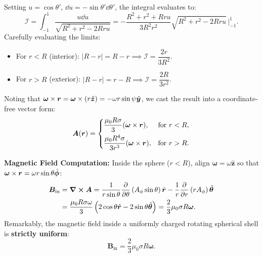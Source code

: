 \begin{example}
\begin{equation}
    \end{equation}
    Setting $u = \cos\theta'$, $\dd{u} = -\sin\theta'\dd{\theta'}$, the integral evaluates to:
    \begin{equation}
        \mathcal{I} = \int_{-1}^1 \frac{u \dd{u}}{\sqrt{R^2 + r^2 - 2Rru}} = -\frac{R^2 + r^2 + Rru}{3R^2 r^2}\sqrt{R^2 + r^2 - 2Rru}\,\Bigg|_{-1}^{1}.
    \end{equation}
    Carefully evaluating the limits:
    \begin{itemize}
        \item For $r < R$ (interior): $|R - r| = R - r \implies \mathcal{I} = \dfrac{2r}{3R^2}$.
        \item For $r > R$ (exterior): $|R - r| = r - R \implies \mathcal{I} = \dfrac{2R}{3r^2}$.
    \end{itemize}
    Noting that $\bm{\omega}\times \bm{r} = \bm{\omega}\times (r\hat{\bm{z}}) = -\omega r \sin\psi \hat{\bm{y}}$, we cast the result into a coordinate-free vector form:
    \begin{equation}
        \bm{A}(\bm{r}) = \begin{cases}
            \dfrac{\mu_0 R \sigma}{3} (\bm{\omega}\times \bm{r}), & \text{for } r < R, \\[1.5ex]
            \dfrac{\mu_0 R^4 \sigma}{3r^3} (\bm{\omega}\times \bm{r}), & \text{for } r > R.
        \end{cases}
    \end{equation}

    \textbf{Magnetic Field Computation:}
    Inside the sphere ($r < R$), align $\bm{\omega} = \omega \hat{\bm{z}}$ so that $\bm{\omega}\times \bm{r} = \omega r \sin\theta \hat{\bm{\phi}}$:
    \begin{align}
        \bm{B}_{\text{in}} &= \curl \bm{A} = \frac{1}{r\sin\theta}\pdv{\theta}\left(A_\phi \sin\theta\right)\hat{\bm{r}} - \frac{1}{r}\pdv{r}\left(r A_\phi\right)\hat{\bm{\theta}} \nonumber \\
        &= \frac{\mu_0 R \sigma \omega}{3} \left( 2\cos\theta \hat{\bm{r}} - 2\sin\theta \hat{\bm{\theta}} \right) = \frac{2}{3}\mu_0 \sigma R \bm{\omega}.
    \end{align}
    Remarkably, the magnetic field inside a uniformly charged rotating spherical shell is \textbf{strictly uniform}:
    \begin{equation}
        \bm{B}_{\text{in}} = \frac{2}{3}\mu_0 \sigma R \bm{\omega}.
    \end{equation}
\end{example}

